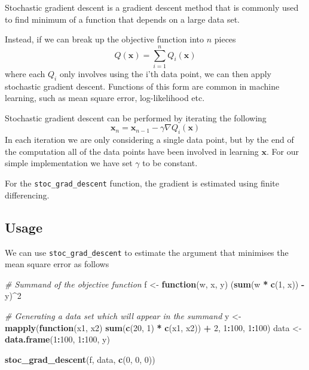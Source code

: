 \documentclass[12pt,]{article}
\newenvironment{Shaded}{\begin{snugshade}}{\end{snugshade}}
\newcommand{\CommentTok}[1]{\textcolor[rgb]{0.56,0.35,0.01}{\textit{#1}}}
\newcommand{\ControlFlowTok}[1]{\textcolor[rgb]{0.13,0.29,0.53}{\textbf{#1}}}
\newcommand{\DecValTok}[1]{\textcolor[rgb]{0.00,0.00,0.81}{#1}}
\newcommand{\KeywordTok}[1]{\textcolor[rgb]{0.13,0.29,0.53}{\textbf{#1}}}
\newcommand{\NormalTok}[1]{#1}
\newcommand{\OperatorTok}[1]{\textcolor[rgb]{0.81,0.36,0.00}{\textbf{#1}}}
\newcommand{\StringTok}[1]{\textcolor[rgb]{0.31,0.60,0.02}{#1}}
\begin{document}
Stochastic gradient descent is a gradient descent method that is
commonly used to find minimum of a function that depends on a large data
set.

Instead, if we can break up the objective function into \(n\) pieces \[
Q(\mathbf{x}) = \sum_{i=1}^nQ_i(\mathbf{x})
\] where each \(Q_i\) only involves using the i'th data point, we can
then apply stochastic gradient descent. Functions of this form are
common in machine learning, such as mean square error, log-likelihood
etc.

Stochastic gradient descent can be performed by iterating the following
\[
    \mathbf{x}_{n} = \mathbf{x}_{n-1} - \gamma \nabla Q_i(\mathbf{x})
\] In each iteration we are only considering a single data point, but by
the end of the computation all of the data points have been involved in
learning \(\mathbf{x}\). For our simple implementation we have set
\(\gamma\) to be constant.

For the \texttt{stoc\_grad\_descent} function, the gradient is estimated
using finite differencing.

\hypertarget{usage-1}{%
\subsection{Usage}\label{usage-1}}

We can use \texttt{stoc\_grad\_descent} to estimate the argument that
minimises the mean square error as follows

\begin{Shaded}
\begin{Highlighting}[]
    \CommentTok{# Summand of the objective function}
\NormalTok{    f <-}\StringTok{ }\ControlFlowTok{function}\NormalTok{(w, x, y) (}\KeywordTok{sum}\NormalTok{(w }\OperatorTok{*}\StringTok{ }\KeywordTok{c}\NormalTok{(}\DecValTok{1}\NormalTok{, x)) }\OperatorTok{-}\StringTok{ }\NormalTok{y)}\OperatorTok{^}\DecValTok{2}

    \CommentTok{# Generating a data set which will appear in the summand}
\NormalTok{    y <-}\StringTok{ }\KeywordTok{mapply}\NormalTok{(}\ControlFlowTok{function}\NormalTok{(x1, x2) }\KeywordTok{sum}\NormalTok{(}\KeywordTok{c}\NormalTok{(}\DecValTok{20}\NormalTok{, }\DecValTok{1}\NormalTok{) }\OperatorTok{*}\StringTok{ }\KeywordTok{c}\NormalTok{(x1, x2)) }\OperatorTok{+}\StringTok{ }\DecValTok{2}\NormalTok{, }\DecValTok{1}\OperatorTok{:}\DecValTok{100}\NormalTok{, }\DecValTok{1}\OperatorTok{:}\DecValTok{100}\NormalTok{)}
\NormalTok{    data <-}\StringTok{ }\KeywordTok{data.frame}\NormalTok{(}\DecValTok{1}\OperatorTok{:}\DecValTok{100}\NormalTok{, }\DecValTok{1}\OperatorTok{:}\DecValTok{100}\NormalTok{, y)}

    \KeywordTok{stoc_grad_descent}\NormalTok{(f, data, }\KeywordTok{c}\NormalTok{(}\DecValTok{0}\NormalTok{, }\DecValTok{0}\NormalTok{, }\DecValTok{0}\NormalTok{))}
\end{Highlighting}
\end{Shaded}
\end{document}
